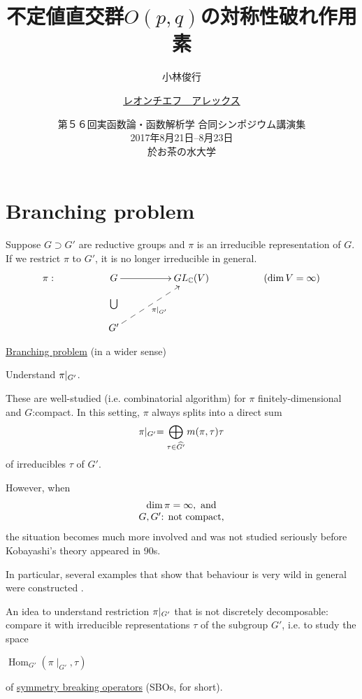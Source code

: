 \documentclass[notes,notheorems]{beamer}
\title{不定値直交群$O(p,q)$の対称性破れ作用素}
\author[小林、\underline{レオンチエフ}]{小林俊行\inst{1} \and \underline{レオンチエフ　アレックス}\inst{2}}
\institute[東大数理] %
{
  \inst{1}%
  東京大学\\
  大学院数理科学研究科{・}\\カブリ数物連携宇宙研究機構
  \and
  \inst{2}%
  東京大学\\
  大学院数理科学研究科
  }
\date[第５６合同シンポジウム]{第５６回実函数論・函数解析学 合同シンポジウム講演集\\2017年8月21日--8月23日\\
於お茶の水大学}
\newcommand{\tmop}[1]{\ensuremath{\operatorname{#1}}}
\theoremstyle{definition}
\theoremstyle{example}
\theoremstyle{plain}
\theoremstyle{mystyle}
\begin{document}
\section{}
\begin{frame}\titlepage\end{frame}

\section{Branching problem}

\begin{frame}{}
Suppose $G \supset G'$ are reductive groups and $\pi$ is an irreducible
representation of $G$. If we restrict $\pi$ to $G'$, it is no longer
irreducible in general.\\
	\[
	\xymatrixrowsep{10pt}
	\xymatrixcolsep{50pt}
	\xymatrix{
		\pi:&G\ar[r]&GL_{\mathbb{C}}(V)&\left( \dim V=\infty \right)\\
	&\bigcup&&\\
	&G'\ar@{-->}[uur]_{\pi\mid_{G'}}
	}
\]
\begin{block}{\underline{Branching problem}  (in a wider sense)}
	\centerline{\large Understand $\pi\kern-0.1cm\mid_{G'}$.}
\end{block}

These are well-studied (i.e. combinatorial algorithm) for $\pi$
finitely-dimensional and $G$:compact. In this setting, $\pi$ always splits
into a direct sum
\begin{equation*}
	\pi\kern-0.1cm\mid_{G'} =  \bigoplus_{\tau \in\widehat{G'}} m (\pi, \tau) \tau
\end{equation*}
of irreducibles $\tau$ of $G'$.
\end{frame}
\begin{frame}{}
However, when
\begin{equation*}
	\begin{array}[]{c}
		\dim\pi=\infty,\mbox{ and}\\
		G,G'\mbox{: not compact,}
	\end{array}
\end{equation*}
the
situation becomes much more involved and was not studied seriously before
Kobayashi's theory appeared in 90s.

In particular, several examples that show
that behaviour is very wild in general were constructed
\cite{Kobayashi2005}.

 An idea to understand restriction $\pi\kern-0.1cm \mid_{G'}$ that is not
discretely decomposable: compare it with irreducible representations $\tau$ of
the subgroup $G'$, i.e. to study the space{

}{\hspace{0.5\columnwidth}}$\tmop{Hom}_{G'} (\pi \mid_{G'}, \tau)${

}of \underline{symmetry breaking operators} (SBOs, for short).
\end{frame}
\end{document}
